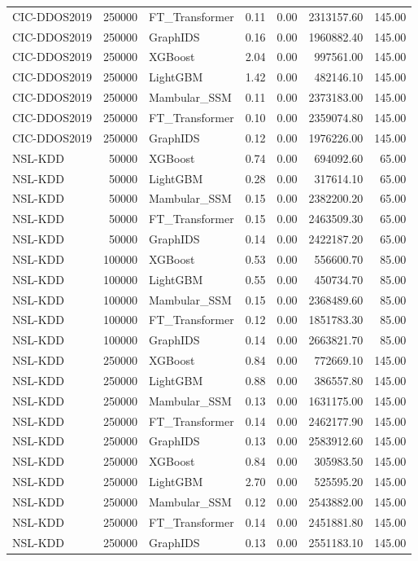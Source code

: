 \begin{table}[t]
\begin{tabular}{lrlrrrr}
CIC-DDOS2019 & 250000 & FT_Transformer & 0.11 & 0.00 & 2313157.60 & 145.00 \\
CIC-DDOS2019 & 250000 & GraphIDS & 0.16 & 0.00 & 1960882.40 & 145.00 \\
CIC-DDOS2019 & 250000 & XGBoost & 2.04 & 0.00 & 997561.00 & 145.00 \\
CIC-DDOS2019 & 250000 & LightGBM & 1.42 & 0.00 & 482146.10 & 145.00 \\
CIC-DDOS2019 & 250000 & Mambular_SSM & 0.11 & 0.00 & 2373183.00 & 145.00 \\
CIC-DDOS2019 & 250000 & FT_Transformer & 0.10 & 0.00 & 2359074.80 & 145.00 \\
CIC-DDOS2019 & 250000 & GraphIDS & 0.12 & 0.00 & 1976226.00 & 145.00 \\
NSL-KDD & 50000 & XGBoost & 0.74 & 0.00 & 694092.60 & 65.00 \\
NSL-KDD & 50000 & LightGBM & 0.28 & 0.00 & 317614.10 & 65.00 \\
NSL-KDD & 50000 & Mambular_SSM & 0.15 & 0.00 & 2382200.20 & 65.00 \\
NSL-KDD & 50000 & FT_Transformer & 0.15 & 0.00 & 2463509.30 & 65.00 \\
NSL-KDD & 50000 & GraphIDS & 0.14 & 0.00 & 2422187.20 & 65.00 \\
NSL-KDD & 100000 & XGBoost & 0.53 & 0.00 & 556600.70 & 85.00 \\
NSL-KDD & 100000 & LightGBM & 0.55 & 0.00 & 450734.70 & 85.00 \\
NSL-KDD & 100000 & Mambular_SSM & 0.15 & 0.00 & 2368489.60 & 85.00 \\
NSL-KDD & 100000 & FT_Transformer & 0.12 & 0.00 & 1851783.30 & 85.00 \\
NSL-KDD & 100000 & GraphIDS & 0.14 & 0.00 & 2663821.70 & 85.00 \\
NSL-KDD & 250000 & XGBoost & 0.84 & 0.00 & 772669.10 & 145.00 \\
NSL-KDD & 250000 & LightGBM & 0.88 & 0.00 & 386557.80 & 145.00 \\
NSL-KDD & 250000 & Mambular_SSM & 0.13 & 0.00 & 1631175.00 & 145.00 \\
NSL-KDD & 250000 & FT_Transformer & 0.14 & 0.00 & 2462177.90 & 145.00 \\
NSL-KDD & 250000 & GraphIDS & 0.13 & 0.00 & 2583912.60 & 145.00 \\
NSL-KDD & 250000 & XGBoost & 0.84 & 0.00 & 305983.50 & 145.00 \\
NSL-KDD & 250000 & LightGBM & 2.70 & 0.00 & 525595.20 & 145.00 \\
NSL-KDD & 250000 & Mambular_SSM & 0.12 & 0.00 & 2543882.00 & 145.00 \\
NSL-KDD & 250000 & FT_Transformer & 0.14 & 0.00 & 2451881.80 & 145.00 \\
NSL-KDD & 250000 & GraphIDS & 0.13 & 0.00 & 2551183.10 & 145.00 \\
\bottomrule
\end{tabular}

\end{table}
